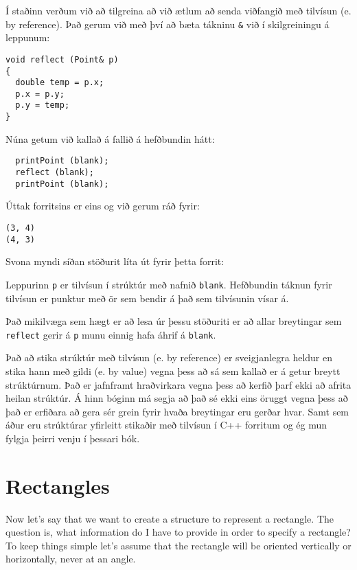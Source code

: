 Í staðinn verðum við að tilgreina að við ætlum að senda viðfangið með tilvísun (e. by reference).
Það gerum við með því að bæta tákninu {\tt \&} við í skilgreiningu á leppunum: 

\begin{verbatim}
void reflect (Point& p)
{
  double temp = p.x;
  p.x = p.y;
  p.y = temp;
}
\end{verbatim}
%
Núna getum við kallað á fallið á hefðbundin hátt:

\begin{verbatim}
  printPoint (blank);
  reflect (blank);
  printPoint (blank);
\end{verbatim}
%
Úttak forritsins er eins og við gerum ráð fyrir: 

\begin{verbatim}
(3, 4)
(4, 3)
\end{verbatim}
%
Svona myndi síðan stöðurit líta út fyrir þetta forrit:

\vspace{0.1in}
\centerline{}
\vspace{0.1in}
%
Leppurinn {\tt p} er tilvísun í strúktúr með nafnið {\tt blank}.
Hefðbundin táknun fyrir tilvísun er punktur með ör sem bendir á það sem tilvísunin vísar á.

Það mikilvæga sem hægt er að lesa úr þessu stöðuriti er að allar breytingar sem 
{\tt reflect} gerir á {\tt p} munu einnig hafa áhrif á {\tt blank}.

Það að stika strúktúr með tilvísun (e. by reference) er sveigjanlegra heldur en stika hann með gildi (e. by value)
vegna þess að sá sem kallað er á getur breytt strúktúrnum.
Það er jafnframt hraðvirkara vegna þess að kerfið þarf ekki að afrita heilan strúktúr.
Á hinn bóginn má segja að það sé ekki eins öruggt vegna þess að það er erfiðara að gera sér grein fyrir hvaða breytingar eru gerðar hvar.
Samt sem áður eru strúktúrar yfirleitt stikaðir með tilvísun í C++ forritum og ég mun fylgja þeirri venju í þessari bók.

\section{Rectangles}

Now let's say that we want to create a structure to represent
a rectangle.  The question is, what information do I have to
provide in order to specify a rectangle?  To keep things simple
let's assume that the rectangle will be oriented vertically or
horizontally, never at an angle.

